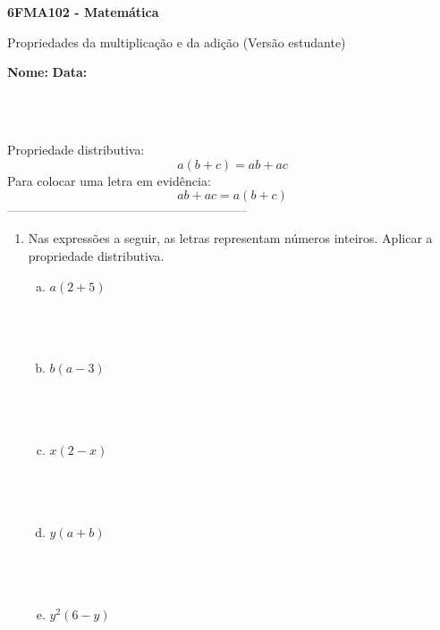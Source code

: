 \documentclass[a4paper,14pt]{article}
\begin{document}
	
	\noindent\textbf{6FMA102 - Matemática} 
	
	\begin{center}Propriedades da multiplicação e da adição (Versão estudante)
	\end{center}
	
	\noindent\textbf{Nome:} \underline{\hspace{10cm}}
	\noindent\textbf{Data:} \underline{\hspace{4cm}}
	
	~ \\ ~
	\begin{multicols}{2}
		\noindent Propriedade distributiva:
		\begin{equation*}
			a(b + c) = ab + ac
		\end{equation*}
		\noindent Para colocar uma letra em evidência:
		\begin{equation*}
			ab + ac = a(b + c)
		\end{equation*}
		\textsubscript{---------------------------------------------------------------------}
    	\begin{enumerate}
    		\item Nas expressões a seguir, as letras representam números inteiros. Aplicar a propriedade distributiva.
    		\begin{enumerate}[a)]
    			\item $a(2 + 5)$ \\\\\\\\
    			\item $b(a - 3)$ \\\\\\\\
    			\item $x(2 - x)$ \\\\\\\\
    			\item $y(a + b)$ \\\\\\\\
    			\item $y^2(6 - y)$ \\\\\\\\

\end{enumerate}
\end{enumerate}
\end{multicols}
\end{document}
